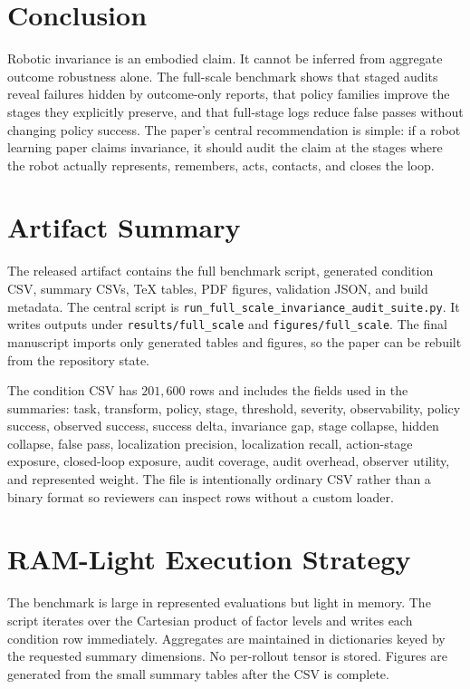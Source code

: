\documentclass{article}
\begin{document}
\section{Conclusion}

Robotic invariance is an embodied claim. It cannot be inferred from aggregate outcome robustness alone. The full-scale benchmark shows that staged audits reveal failures hidden by outcome-only reports, that policy families improve the stages they explicitly preserve, and that full-stage logs reduce false passes without changing policy success. The paper's central recommendation is simple: if a robot learning paper claims invariance, it should audit the claim at the stages where the robot actually represents, remembers, acts, contacts, and closes the loop.

\clearpage
\appendix
\renewcommand{\thesection}{A.\arabic{section}}
\setcounter{section}{0}

\section{Artifact Summary}

The released artifact contains the full benchmark script, generated condition CSV, summary CSVs, TeX tables, PDF figures, validation JSON, and build metadata. The central script is \texttt{run\_full\_scale\_invariance\_audit\_suite.py}. It writes outputs under \texttt{results/full\_scale} and \texttt{figures/full\_scale}. The final manuscript imports only generated tables and figures, so the paper can be rebuilt from the repository state.

The condition CSV has $201{,}600$ rows and includes the fields used in the summaries: task, transform, policy, stage, threshold, severity, observability, policy success, observed success, success delta, invariance gap, stage collapse, hidden collapse, false pass, localization precision, localization recall, action-stage exposure, closed-loop exposure, audit coverage, audit overhead, observer utility, and represented weight. The file is intentionally ordinary CSV rather than a binary format so reviewers can inspect rows without a custom loader.

\section{RAM-Light Execution Strategy}

The benchmark is large in represented evaluations but light in memory. The script iterates over the Cartesian product of factor levels and writes each condition row immediately. Aggregates are maintained in dictionaries keyed by the requested summary dimensions. No per-rollout tensor is stored. Figures are generated from the small summary tables after the CSV is complete.
\end{document}
